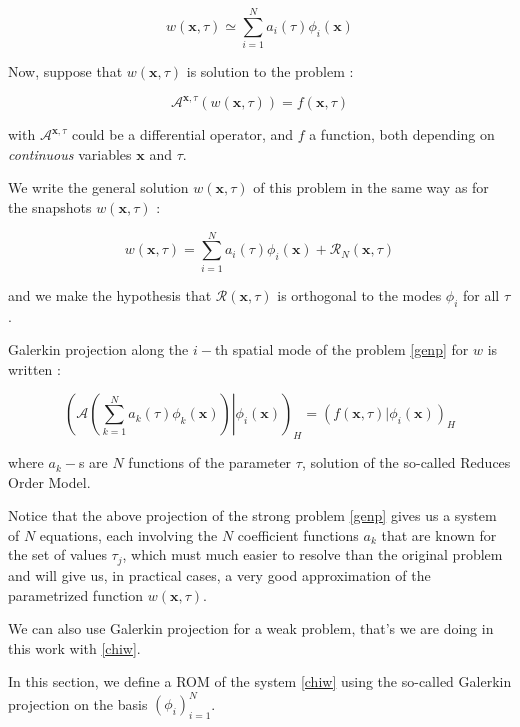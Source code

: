 \begin{equation}
w(\mathbf{x},\tau)\simeq\sum\limits_{i=1}^N a_i(\tau)\phi_i(\mathbf{x})
\end{equation}

Now, suppose that $w(\mathbf{x},\tau)$ is solution to the problem :

\begin{equation}\label{genp}
\mathcal{A}^{\mathbf{x},\tau}\left(w(\mathbf{x},\tau)\right)=f(\mathbf{x},\tau)
\end{equation}

with $\mathcal{A}^{\mathbf{x},\tau}$ could be a differential operator, %
and $f$ a function, both depending on \emph{continuous} variables $\mathbf{x}$ and $\tau$.

\par
We write the general solution $w(\mathbf{x},\tau)$ of this problem in the same way as for the snapshots $w(\mathbf{x},\tau)$ :

\[w(\mathbf{x},\tau)=\sum\limits_{i=1}^N a_i(\tau)\phi_i(\mathbf{x})+\mathcal{R}_N(\mathbf{x},\tau)\]

and we make the hypothesis that $\mathcal{R}(\mathbf{x},\tau)$ is orthogonal to the modes $\phi_i$ for all $\tau$.

\par
Galerkin projection along the $i-$th spatial mode of the problem \ref{genp} for $w$ is written :

\[%
\left(\left.\mathcal{A}\left(\sum\limits_{k=1}^N a_k(\tau)\phi_k(\mathbf{x})\right) \right|\phi_i\left(\mathbf{x}\right)\right)_H %
= \left(f\left(\mathbf{x},\tau\right)|\phi_i(\mathbf{x})\right)_H%
\]

where $a_k-$s are $N$ functions of the parameter $\tau$, solution of the so-called Reduces Order Model.

\par
Notice that the above projection of the strong problem \ref{genp} gives us a system of $N$ equations, each involving the $N$ coefficient functions $a_k$ %
that are known for the set of values $\tau_j$, which must much easier to resolve than the original problem and will give us, %
in practical cases, a very good approximation of the parametrized function $w(\mathbf{x},\tau)$.

\par
We can also use Galerkin projection for a weak problem, that's we are doing in this work with \ref{chiw}.

\etoile
In this section, we define a ROM of the system \ref{chiw} using the so-called Galerkin projection on the basis $(\phi_i)_{i=1}^N$.

